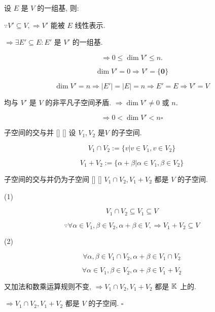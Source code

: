 \documentclass[UTF8]{ctexart}
\DeclareMathOperator{\0}{\mathbf{0}}
\DeclareMathOperator{\<}{\langle}
\renewcommand{\>}{\rangle}
\begin{document}
		\begin{prf}
		
			设 \(E\) 是 \(V\) 的一组基, 则: 
			
			 \(\because V'\subseteq V, \Longrightarrow V'\) 能被 \(E\) 线性表示. 
			
			 \(\Longrightarrow \exists E'\subseteq E: E'\) 是 \(V'\) 的一组基. 
			
			\[\Longrightarrow 0\leq \dim V' \leq n.\]
			
			\[\dim V'=0\Longrightarrow V'=\{\mathbf{0}\}\]
			
			\[\dim V'=n\Longrightarrow |E'|=|E|=n\Longrightarrow E'=E\Longrightarrow V'=V\]
			
			均与 \(V'\) 是 \(V\) 的非平凡子空间矛盾.  \(\Longrightarrow \dim V'\neq 0\) 或 \(n\). 
			
			\[\Longrightarrow 0<\dim V'<n\square\]
		\end{prf}
  
		\begin{dfn}
			[]
			{子空间的交与并}
			[]
			[]
			设 \(V_{1},V_{2}\) 是 \(V\) 的子空间. 
			
			\[V_{1}\cap V_{2}:=\{v|v\in V_{1},v\in V_{2}\}\]
			
			\[V_{1}+V_{2}:=\{\alpha+\beta|\alpha\in V_{1}, \beta\in V_{2}\}\]
		\end{dfn}
		
		\begin{ppt}
			[]
			{子空间的交与并仍为子空间}
			[]
			[]
			 \(V_{1}\cap V_{2}, V_{1}+V_{2}\) 都是 \(V\) 的子空间. 
		\end{ppt}
  
		\begin{prf}
		
			(1)
			
			\[V_{1}\cap V_{2}\subseteq V_{1}\subseteq V\]
			
			\[\because \forall \alpha \in V_{1},\beta\in V_{2}, \alpha+\beta\in V, \Longrightarrow V_{1}+V_{2}\subseteq V\]
			
			(2)
			
			\[\forall \alpha,\beta \in V_{1}\cap V_{2}, \alpha+\beta\in V_{1}\cap V_{2}\]
			
			\[\forall \alpha \in V_{1}, \beta\in V_{2}, \alpha+\beta\in V_{1}+V_{2}\]
			
			又加法和数乘运算规则不变,  \(\Longrightarrow V_{1}\cap V_{2}, V_{1}+V_{2}\) 都是 \(\operatorname{\mathbb{K}}\) 上的. 
			
			 \(\Longrightarrow V_{1}\cap V_{2}, V_{1}+V_{2}\) 都是 \(V\) 的子空间.  \(\square\) 
		\end{prf}
  
\end{document}
